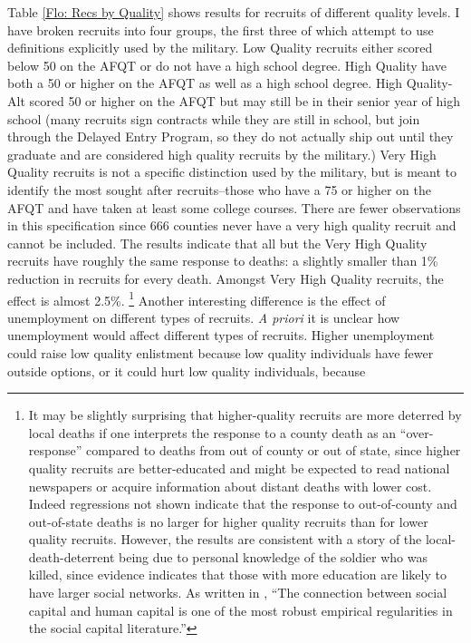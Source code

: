 \documentclass[12pt] {article}
\begin{document}
Table \ref{Flo: Recs by Quality} shows results for recruits
of different quality levels. I have broken recruits into four groups, the first three of which attempt to use definitions explicitly used by the military.
Low Quality recruits either scored below 50 on the AFQT or do not
have a high school degree. High Quality have both a 50 or higher on
the AFQT as well as a high school degree. High Quality-Alt scored
50 or higher on the AFQT but may still be in their senior year of
high school (many recruits sign contracts while they are still in
school, but join through the Delayed Entry Program, so they do not
actually ship out until they graduate and are considered high quality
recruits by the military.) Very High Quality recruits is not a specific
distinction used by the military, but is meant to identify the most
sought after recruits--those who have a 75 or higher on the AFQT and
have taken at least some college courses. There are fewer observations in this specification since 666 counties never have a very high quality recruit and cannot be included. The results indicate that all but the Very High Quality recruits have roughly the same response
to deaths: a slightly smaller than 1\% reduction in recruits for every
death. Amongst Very High Quality recruits, the effect is almost 2.5\%.%
\footnote{It may be slightly surprising that higher-quality recruits are more
deterred by local deaths if one interprets the response to a county
death as an {}``over-response'' compared to deaths from out of county
or out of state, since higher quality recruits are better-educated
and might be expected to read national newspapers or acquire information
about distant deaths with lower cost. Indeed regressions not shown
indicate that the response to out-of-county and out-of-state deaths
is no larger for higher quality recruits than for lower quality recruits.
However, the results are consistent with a story of the local-death-deterrent
being due to personal knowledge of the soldier who was killed, since
evidence indicates that those with more education are likely to have
larger social networks. As written in \cite{GlaeserSocialNetworks},
{}``The connection between social capital and human capital is one
of the most robust empirical regularities in the social capital literature.'' %
} Another interesting difference is the effect of unemployment on different
types of recruits. \emph{A priori} it is unclear how unemployment
would affect different types of recruits. Higher unemployment could
raise low quality enlistment because low quality individuals have
fewer outside options, or it could hurt low quality individuals, because
\end{document}
